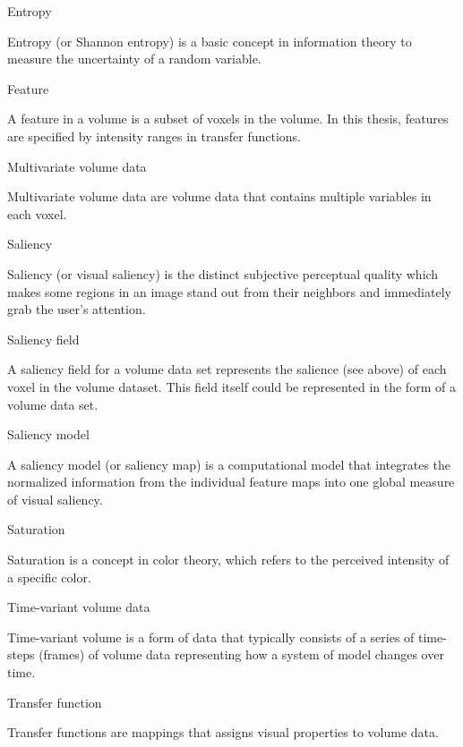 \documentclass[a4paper, 12pt, twoside, openright]{report}         %
\begin{document}
\begin{description}
	
\item Entropy

Entropy (or Shannon entropy) is a basic concept in information theory to measure the uncertainty of a random variable.
	
\item Feature

A feature in a volume is a subset of voxels in the volume. In this thesis, features are specified by intensity ranges in transfer functions.

\item Multivariate volume data

Multivariate volume data are volume data that contains multiple variables in each voxel.

\item Saliency

Saliency (or visual saliency) is the distinct subjective perceptual quality which makes some regions in an image stand out from their neighbors and immediately grab the user's attention.

\item Saliency field

A saliency field for a volume data set represents the salience (see above) of each voxel in the volume dataset. This field itself could be represented in the form of a volume data set.
	
\item Saliency model

A saliency model (or saliency map) is a computational model that integrates the normalized information from the individual feature maps into one global measure of visual saliency.

\item Saturation

Saturation is a concept in color theory, which refers to the perceived intensity of a specific color.

\item Time-variant volume data

Time-variant volume is a form of data that typically consists of a series of time-steps (frames) of volume data representing how a system of model changes over time.

\item Transfer function

Transfer functions are mappings that assigns visual properties to volume data.


\end{description}
\end{document}
